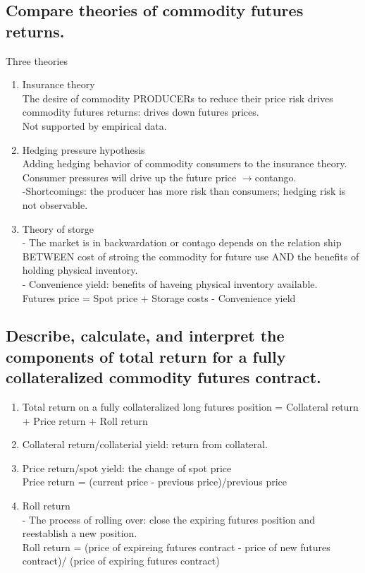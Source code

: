 \documentclass{article}
\newcommand{\be}{\begin{enumerate}}
\newcommand{\ee}{\end{enumerate}}
\newcommand{\ra}{$\rightarrow$}
\begin{document}
\subsection{Compare theories of commodity futures returns.}
Three theories
\be
    \item Insurance theory
        \\The desire of commodity PRODUCERs to reduce their price risk drives
        commodity futures returns: drives down futures prices.
        \\ Not supported by empirical data.
    \item Hedging pressure hypothesis
        \\ Adding hedging behavior of commodity consumers to the insurance theory.
        Consumer pressures will drive up the future price \ra contango.
        \\ -Shortcomings: the producer has more risk than consumers; hedging risk is not observable.
    \item Theory of storge
        \\ - The market is in backwardation or contago depends on the relation ship BETWEEN
    cost of stroing the commodity for future use AND the benefits of holding physical inventory.
        \\ - Convenience yield: benefits of haveing physical inventory available.
        \\ Futures price = Spot price + Storage costs - Convenience yield
\ee
\subsection{Describe, calculate, and interpret the components of total return for a fully
collateralized commodity futures contract.}
\be
    \item Total return on a fully collateralized long futures position = Collateral return
    + Price return + Roll return
    \item Collateral return/collaterial yield: return from collateral. 
    \item Price return/spot yield: the change of spot price
    \\ Price return = (current price - previous price)/previous price
    \item Roll return
    \\ - The process of rolling over: close the expiring futures position and reestablish
    a new position.
    \\ Roll return = (price of expireing futures contract - price of new futures contract)/
    (price of expiring futures contract)
\ee
\end{document}
